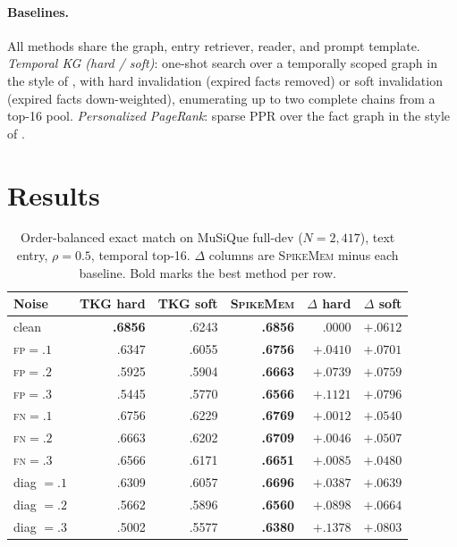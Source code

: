 \documentclass[11pt]{article}
\newcommand{\sm}{\textsc{SpikeMem}}
\begin{document}
\paragraph{Baselines.}
All methods share the graph, entry retriever, reader, and prompt template.
\emph{Temporal KG (hard / soft)}: one-shot search over a temporally scoped graph in the style of
\citet{rasmussen2025zep}, with hard invalidation (expired facts removed) or soft invalidation (expired
facts down-weighted), enumerating up to two complete chains from a top-16 pool.
\emph{Personalized PageRank}: sparse PPR over the fact graph in the style of
\citet{gutierrez2024hipporag}.

\section{Results}
\label{sec:results}

\begin{table}[t]
\centering
\caption{Order-balanced exact match on MuSiQue full-dev ($N=2{,}417$), text entry, $\rho=0.5$,
temporal top-16. $\Delta$ columns are \sm{} minus each baseline. Bold marks the best method per row.}
\label{tab:main}
\small
\begin{tabular}{lrrrrr}
\toprule
Noise & TKG hard & TKG soft & \sm{} & $\Delta$ hard & $\Delta$ soft \\
\midrule
clean            & \textbf{.6856} & .6243 & \textbf{.6856} & $.0000$  & $+.0612$ \\
\textsc{fp}$=.1$ & .6347 & .6055 & \textbf{.6756} & $+.0410$ & $+.0701$ \\
\textsc{fp}$=.2$ & .5925 & .5904 & \textbf{.6663} & $+.0739$ & $+.0759$ \\
\textsc{fp}$=.3$ & .5445 & .5770 & \textbf{.6566} & $+.1121$ & $+.0796$ \\
\textsc{fn}$=.1$ & .6756 & .6229 & \textbf{.6769} & $+.0012$ & $+.0540$ \\
\textsc{fn}$=.2$ & .6663 & .6202 & \textbf{.6709} & $+.0046$ & $+.0507$ \\
\textsc{fn}$=.3$ & .6566 & .6171 & \textbf{.6651} & $+.0085$ & $+.0480$ \\
diag $=.1$       & .6309 & .6057 & \textbf{.6696} & $+.0387$ & $+.0639$ \\
diag $=.2$       & .5662 & .5896 & \textbf{.6560} & $+.0898$ & $+.0664$ \\
diag $=.3$       & .5002 & .5577 & \textbf{.6380} & $+.1378$ & $+.0803$ \\
\bottomrule
\end{tabular}
\end{table}
\end{document}
